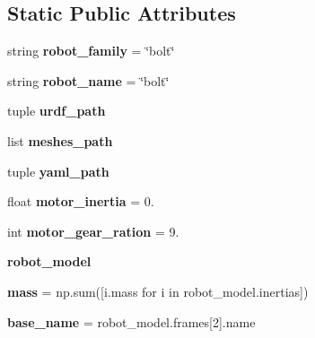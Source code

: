 \subsection*{Static Public Attributes}
\begin{DoxyCompactItemize}
\item 
\mbox{\label{classrobot__properties__bolt_1_1config_1_1BoltConfig_a2ae10e99a7cba2220217c56d1a4d574f}} 
string {\bfseries robot\+\_\+family} = \char`\"{}bolt\char`\"{}
\item 
\mbox{\label{classrobot__properties__bolt_1_1config_1_1BoltConfig_ad95290beb57b4a2b73ae771cd48775a8}} 
string {\bfseries robot\+\_\+name} = \char`\"{}bolt\char`\"{}
\item 
tuple {\bfseries urdf\+\_\+path}
\item 
list {\bfseries meshes\+\_\+path}
\item 
tuple {\bfseries yaml\+\_\+path}
\item 
\mbox{\label{classrobot__properties__bolt_1_1config_1_1BoltConfig_a3845b64e9c77be3a4c86c4759a524421}} 
float {\bfseries motor\+\_\+inertia} = 0.
\item 
\mbox{\label{classrobot__properties__bolt_1_1config_1_1BoltConfig_ac4ecaff049f5b2100d4f7a00ce636acd}} 
int {\bfseries motor\+\_\+gear\+\_\+ration} = 9.
\item 
{\bfseries robot\+\_\+model}
\item 
\mbox{\label{classrobot__properties__bolt_1_1config_1_1BoltConfig_af1f4a09c638014176ef3d2070641e3c0}} 
{\bfseries mass} = np.\+sum(\mbox{[}i.\+mass for i in robot\+\_\+model.\+inertias\mbox{]})
\item 
\mbox{\label{classrobot__properties__bolt_1_1config_1_1BoltConfig_ac17e14abb668429480eb737ab8809de4}} 
{\bfseries base\+\_\+name} = robot\+\_\+model.\+frames\mbox{[}2\mbox{]}.name
\item 
\mbox{\label{classrobot__properties__bolt_1_1config_1_1BoltConfig_af7b7472e47666cc878722d3723be8842}} 

\end{DoxyCompactItemize}
